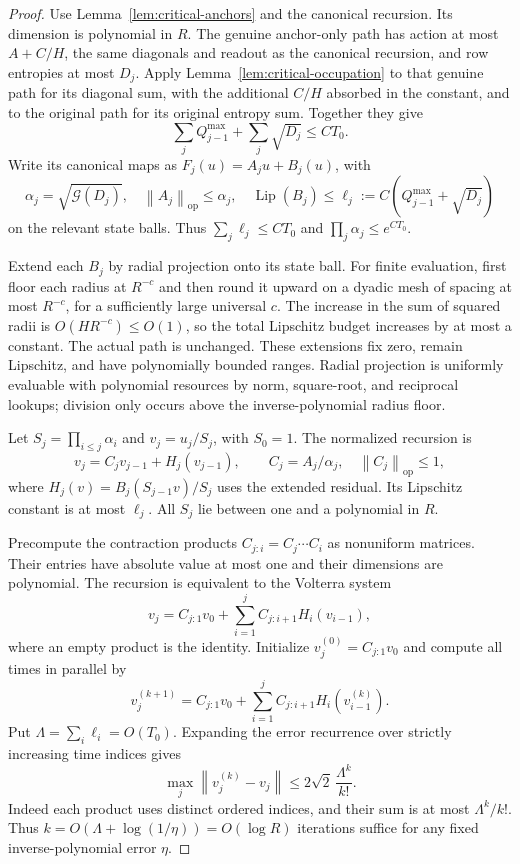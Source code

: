 \documentclass[11pt]{article}
\theoremstyle{remark}
\newcommand{\Lip}{\operatorname{Lip}}
\newcommand{\Gain}{\mathcal G}
\newcommand{\norm}[1]{\left\lVert #1\right\rVert}
\begin{document}
\begin{proof}
Use Lemma~\ref{lem:critical-anchors} and the canonical recursion.
Its dimension is polynomial in $R$. The genuine anchor-only path
has action at most $A+C/H$, the same diagonals and readout as the
canonical recursion, and row entropies at most $D_j$.
Apply Lemma~\ref{lem:critical-occupation} to that genuine path for
its diagonal sum, with the additional $C/H$ absorbed in the constant,
and to the original path for its original entropy sum. Together they give
\[
 \sum_j Q_{j-1}^{\max}+\sum_j\sqrt{D_j}\le CT_0.
\]
Write its canonical maps as $F_j(u)=A_ju+B_j(u)$, with
\[
 \alpha_j=\sqrt{\Gain(D_j)},\quad
 \norm{A_j}_{\mathrm{op}}\le\alpha_j,\quad
 \Lip(B_j)\le\ell_j:=C(Q_{j-1}^{\max}+\sqrt{D_j})
\]
on the relevant state balls. Thus
$\sum_j\ell_j\le CT_0$ and $\prod_j\alpha_j\le e^{CT_0}$.

Extend each $B_j$ by radial projection onto its state ball. For
finite evaluation, first floor each radius at $R^{-c}$ and then round
it upward on a dyadic mesh of spacing at most $R^{-c}$, for a
sufficiently large universal $c$. The increase in the sum of squared
radii is $O(HR^{-c})\le O(1)$, so the total Lipschitz budget increases
by at most a constant. The actual path is unchanged.
These extensions fix zero, remain Lipschitz, and have polynomially
bounded ranges. Radial projection is uniformly evaluable with
polynomial resources by norm, square-root, and reciprocal lookups;
division only occurs above the inverse-polynomial radius floor.

Let $S_j=\prod_{i\le j}\alpha_i$ and $v_j=u_j/S_j$, with $S_0=1$.
The normalized recursion is
\[
 v_j=C_jv_{j-1}+H_j(v_{j-1}),\qquad
 C_j=A_j/\alpha_j,\quad \norm{C_j}_{\mathrm{op}}\le1,
\]
where $H_j(v)=B_j(S_{j-1}v)/S_j$ uses the extended residual.
Its Lipschitz constant is at most $\ell_j$. All $S_j$ lie between
one and a polynomial in $R$.

Precompute the contraction products
$C_{j:i}=C_j\cdots C_i$ as nonuniform matrices. Their entries have
absolute value at most one and their dimensions are polynomial.
The recursion is equivalent to the Volterra system
\[
 v_j=C_{j:1}v_0+\sum_{i=1}^j C_{j:i+1}H_i(v_{i-1}),
\]
where an empty product is the identity. Initialize
$v_j^{(0)}=C_{j:1}v_0$ and compute all times in parallel by
\begin{equation}
 v_j^{(k+1)}=C_{j:1}v_0+
             \sum_{i=1}^j C_{j:i+1}H_i(v_{i-1}^{(k)}).
 \label{eq:critical-picard}
\end{equation}
Put $\Lambda=\sum_i\ell_i=O(T_0)$. Expanding the error recurrence
over strictly increasing time indices gives
\[
 \max_j\norm{v_j^{(k)}-v_j}
 \le2\sqrt2\,\frac{\Lambda^k}{k!}.
\]
Indeed each product uses distinct ordered indices, and their sum
is at most $\Lambda^k/k!$. Thus
$k=O(\Lambda+\log(1/\eta))=O(\log R)$ iterations suffice for
any fixed inverse-polynomial error $\eta$.


\end{proof}
\end{document}
